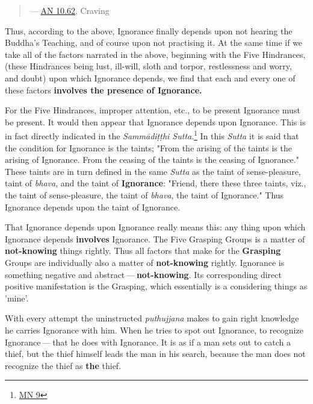 \begin{quotation}
 — \href{https://suttacentral.net/an10.62/en/bodhi}{AN 10.62}, Craving


\end{quotation}

Thus, according to the above, Ignorance finally depends upon not hearing
the Buddha’s Teaching, and of course upon not practising it. At the same
time if we take all of the factors narrated in the above, beginning with
the Five Hindrances, (these Hindrances being lust, ill-will, sloth and
torpor, restlessness and worry, and doubt) upon which Ignorance depends,
we find that each and every one of these factors \textbf{involves the presence
of Ignorance.}


For the Five Hindrances, improper attention, etc., to be present
Ignorance must be present. It would then appear that Ignorance depends
upon Ignorance. This is in fact directly indicated in the \emph{Sammādiṭṭhi
Sutta}.\footnote{\href{https://suttacentral.net/mn9/en/bodhi}{MN 9}} In this \emph{Sutta} it is said that
the condition for Ignorance is the taints; "From the arising of the
taints is the arising of Ignorance. From the ceasing of the taints is
the ceasing of Ignorance." These taints are in turn defined in the same
\emph{Sutta} as the taint of sense-pleasure, taint of \emph{bhava}, and the
taint of \textbf{Ignorance}: "Friend, there these three taints, viz., the
taint of sense-pleasure, the taint of \emph{bhava}, the taint of
Ignorance." Thus Ignorance depends upon the taint of Ignorance.


That Ignorance depends upon Ignorance really means this: any thing upon
which Ignorance depends \textbf{involves} Ignorance. The Five Grasping Groups
is a matter of \textbf{not-knowing} things rightly. Thus all factors that make
for the \textbf{Grasping} Groups are individually also a matter of
\textbf{not-knowing} rightly. Ignorance is something negative and abstract — \textbf{not-knowing}. Its corresponding direct positive manifestation is the
Grasping, which essentially is a considering things as 'mine'.


With every attempt the uninstructed \emph{puthujjana} makes to gain right
knowledge he carries Ignorance with him. When he tries to spot out
Ignorance, to recognize Ignorance — that he does with Ignorance. It is
as if a man sets out to catch a thief, but the thief himself leads the
man in his search, because the man does not recognize the thief as \textbf{the}
thief.


